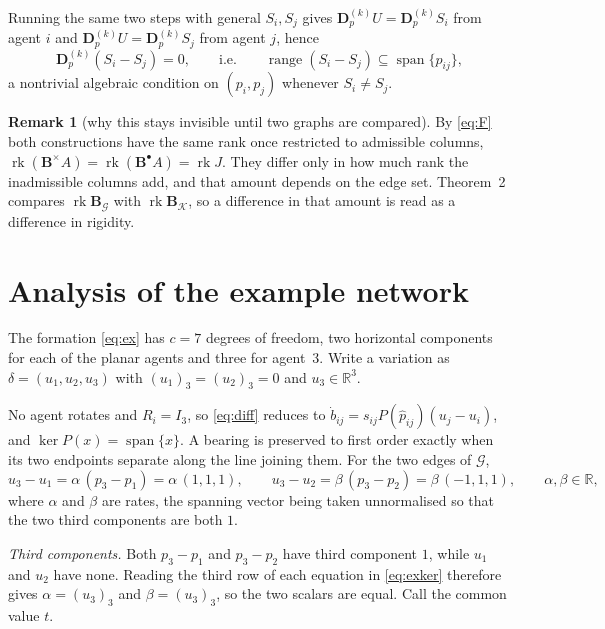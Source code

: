 \documentclass[11pt,a4paper]{article}
\theoremstyle{plain}
\theoremstyle{definition}
\newtheorem{remark}{Remark}
\newcommand{\R}{\mathbb{R}}
\newcommand{\rank}{\operatorname{rk}}
\newcommand{\vspan}{\operatorname{span}}
\newcommand{\Bper}{\mathbf{B}^{\times}}
\newcommand{\Bnode}{\mathbf{B}^{\bullet}}
\newcommand{\Dp}{\mathbf{D}_p}
\begin{document}
Running the same two steps with general $S_i,S_j$ gives
$\Dp^{(k)}U=\Dp^{(k)}S_i$ from agent $i$ and $\Dp^{(k)}U=\Dp^{(k)}S_j$ from
agent $j$, hence
\begin{equation}\label{eq:general}
  \Dp^{(k)}(S_i-S_j)=0,
  \qquad\text{i.e.}\qquad
  \operatorname{range}(S_i-S_j)\subseteq\vspan\{\hat p_{ij}\},
\end{equation}
a nontrivial algebraic condition on $(p_i,p_j)$ whenever $S_i\neq S_j$.

\begin{remark}[why this stays invisible until two graphs are compared]
By \eqref{eq:F} both constructions have the same rank once restricted to
admissible columns, $\rank(\Bper A)=\rank(\Bnode A)=\rank J$. They differ only
in how much rank the inadmissible columns add, and that amount depends on the
edge set. Theorem~2 compares $\rank\mathbf B_{\mathcal G}$ with
$\rank\mathbf B_{\mathcal K}$, so a difference in that amount is read as a
difference in rigidity.
\end{remark}

\section{Analysis of the example network}\label{sec:example}

The formation \eqref{eq:ex} has $c=7$ degrees of freedom, two horizontal
components for each of the planar agents and three for agent~3. Write a
variation as $\delta=(u_1,u_2,u_3)$ with $(u_1)_3=(u_2)_3=0$ and
$u_3\in\R^3$.

No agent rotates and $R_i=I_3$, so \eqref{eq:diff} reduces to
$\dot b_{ij}=s_{ij}P(\hat p_{ij})(u_j-u_i)$, and $\ker P(x)=\vspan\{x\}$. A
bearing is preserved to first order exactly when its two endpoints separate
along the line joining them. For the two edges of $\mathcal G$,
\begin{equation}\label{eq:exker}
  u_3-u_1=\alpha\,(p_3-p_1)=\alpha\,(1,1,1),
  \qquad
  u_3-u_2=\beta\,(p_3-p_2)=\beta\,(-1,1,1),
  \qquad \alpha,\beta\in\R ,
\end{equation}
where $\alpha$ and $\beta$ are rates, the spanning vector being taken
unnormalised so that the two third components are both $1$.

\emph{Third components.} Both $p_3-p_1$ and $p_3-p_2$ have third component $1$,
while $u_1$ and $u_2$ have none. Reading the third row of each equation in
\eqref{eq:exker} therefore gives $\alpha=(u_3)_3$ and $\beta=(u_3)_3$, so the
two scalars are equal. Call the common value $t$.
\end{document}
